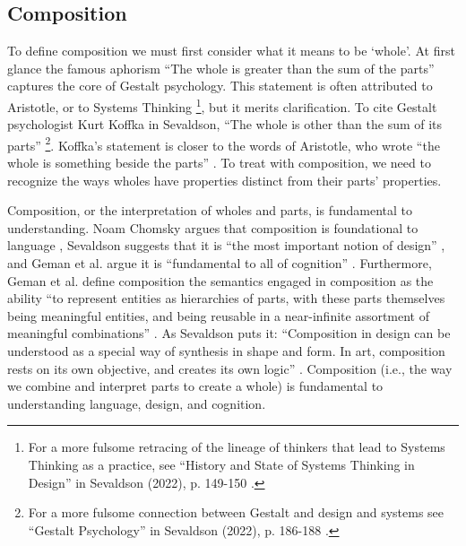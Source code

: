 \subsection{Composition}
To define composition we must first consider what it means to be `whole’. At first glance the famous aphorism ``The whole is greater than the sum of the parts” captures the core of Gestalt psychology. This statement is often attributed to Aristotle, or to Systems Thinking \citep[p. 163]{sevaldson_designing_2022}\footnote{For a more fulsome retracing of the lineage of thinkers that lead to Systems Thinking as a practice, see ``History and State of Systems Thinking in Design” in Sevaldson (2022), p. 149-150 \citep[p. 148-150]{sevaldson_designing_2022}.}, but it merits clarification. To cite Gestalt psychologist Kurt Koffka in Sevaldson, ``The whole is other than the sum of its parts” \citep[p. 163]{sevaldson_designing_2022}\footnote{For a more fulsome connection between Gestalt and design and systems see ``Gestalt Psychology” in Sevaldson (2022), p. 186-188 \citep[p. 163-167]{sevaldson_designing_2022}.}. Koffka’s statement is closer to the words of Aristotle, who wrote ``the whole is something beside the parts” \citep{aristotle_metaphysics_1989}. To treat with composition, we need to recognize the ways wholes have properties distinct from their parts' properties.

Composition, or the interpretation of wholes and parts, is fundamental to understanding. Noam Chomsky argues that composition is foundational to language \citep{chomsky_knowledge_1986,chomsky_syntactic_2002}, Sevaldson suggests that it is ``the most important notion of design” \citep[p. 162]{sevaldson_designing_2022}, and Geman et al. argue it is “fundamental to all of cognition” \citep[p. 1]{geman_composition_2002}. Furthermore, Geman et al. define composition the semantics engaged in composition as the ability ``to represent entities as hierarchies of parts, with these parts themselves being meaningful entities, and being reusable in a near-infinite assortment of meaningful combinations” \citep[p. 1]{geman_composition_2002}. As Sevaldson puts it: ``Composition in design can be understood as a special way of synthesis in shape and form. In art, composition rests on its own objective, and creates its own logic” \citep[p. 167]{sevaldson_designing_2022}. Composition (i.e., the way we combine and interpret parts to create a whole) is fundamental to understanding language, design, and cognition.

